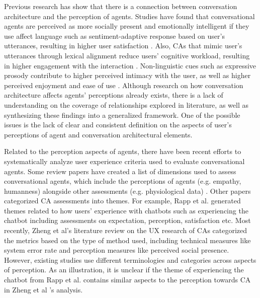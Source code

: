 \documentclass[sigconf,screen,review, anonymous]{acmart}
\begin{document}
Previous research has show that there is a connection between conversation architecture and the perception of agents. Studies have found that conversational agents are perceived as more socially present and emotionally intelligent if they use affect language such as sentiment-adaptive response based on user's utterances, resulting in higher user satisfaction \cite{diederich2019emulating}\cite{yang2017perceived}. Also, CAs that mimic user's utterances through lexical alignment reduce users' cognitive workload, resulting in higher engagement with the interaction \cite{spillner2021talk}. Non-linguistic cues such as expressive prosody contribute to higher perceived intimacy with the user, as well as higher perceived enjoyment and ease of use \cite{kim2020can}. Although research on how conversation architecture affects agents' perceptions already exists, there is a lack of understanding on the coverage of relationships explored in literature, as well as synthesizing these findings into a generalized framework. One of the possible issues is the lack of clear and consistent definition on the aspects of user's perceptions of agent and conversation architectural elements.

Related to the perception aspects of agents, there have been recent efforts to systematically analyze user experience criteria used to evaluate conversational agents. Some review papers have created a list of dimensions used to assess conversational agents, which include the perceptions of agents (e.g. empathy, humanness) alongside other assessments (e.g. physiological data) \cite{clark2019state}\cite{finch2020towards}.
Other papers categorized CA assessments into themes. For example, Rapp et al. \cite{rapp2021human} generated themes related to how users' experience with chatbots such as experiencing the chatbot including assessments on expectation, perception, satisfaction etc. Most recently, Zheng et al's literature review on the UX research of CAs \cite{zheng2022ux} categorized the metrics based on the type of method used, including technical measures like system error rate and perception measures like perceived social presence. However, existing studies use different terminologies and categories across aspects of perception. As an illustration, it is unclear if the theme of experiencing the chatbot from Rapp et al. \cite{rapp2021human} contains similar aspects to the perception towards CA in Zheng et al \cite{zheng2022ux}'s analysis.
 
\end{document}

